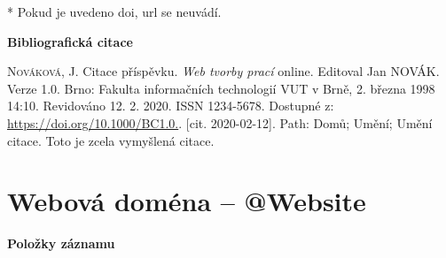 \bigskip
* Pokud je uvedeno doi, url se neuvádí.

\bigskip

\noindent \textbf{Bibliografická citace}

\medskip

\noindent \textsc{Nováková}, J. Citace příspěvku. \textit{Web tvorby prací} online. Editoval Jan NOVÁK. Verze 1.0. Brno: Fakulta informačních technologií VUT v Brně, 2. března 1998 14:10. Revidováno 12. 2. 2020. ISSN 1234-5678.  Dostupné z: \url{https://doi.org/10.1000/BC1.0.}. [cit. 2020-02-12]. Path: Domů; Umění; Umění citace. Toto je zcela vymyšlená citace.
\newpage
\section*{Webová doména -- @Website}
\label{pr-website}
\noindent \textbf{Položky záznamu}

\medskip


